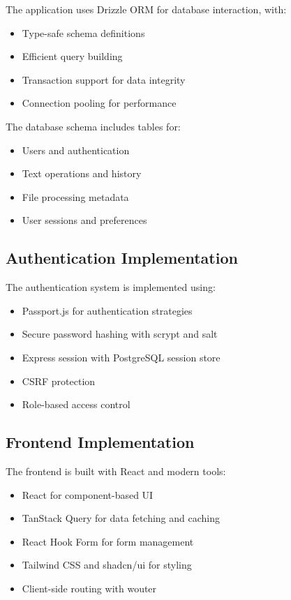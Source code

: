 \documentclass[12pt,a4paper]{article}
\begin{document}
The application uses Drizzle ORM for database interaction, with:

\begin{itemize}
    \item Type-safe schema definitions
    \item Efficient query building
    \item Transaction support for data integrity
    \item Connection pooling for performance
\end{itemize}

The database schema includes tables for:

\begin{itemize}
    \item Users and authentication
    \item Text operations and history
    \item File processing metadata
    \item User sessions and preferences
\end{itemize}

\subsection{Authentication Implementation}

The authentication system is implemented using:

\begin{itemize}
    \item Passport.js for authentication strategies
    \item Secure password hashing with scrypt and salt
    \item Express session with PostgreSQL session store
    \item CSRF protection
    \item Role-based access control
\end{itemize}

\subsection{Frontend Implementation}

The frontend is built with React and modern tools:

\begin{itemize}
    \item React for component-based UI
    \item TanStack Query for data fetching and caching
    \item React Hook Form for form management
    \item Tailwind CSS and shadcn/ui for styling
    \item Client-side routing with wouter
\end{itemize}
\end{document}
